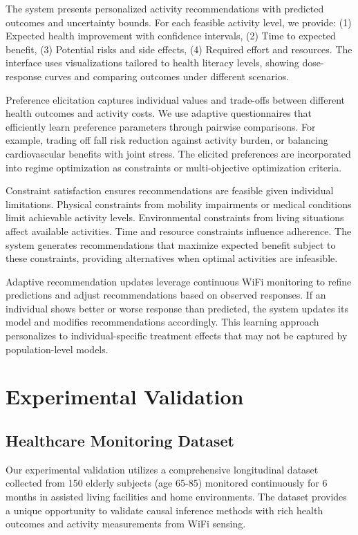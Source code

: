 \documentclass[journal]{IEEEtran}
\begin{document}
The system presents personalized activity recommendations with predicted outcomes and uncertainty bounds. For each feasible activity level, we provide: (1) Expected health improvement with confidence intervals, (2) Time to expected benefit, (3) Potential risks and side effects, (4) Required effort and resources. The interface uses visualizations tailored to health literacy levels, showing dose-response curves and comparing outcomes under different scenarios.

Preference elicitation captures individual values and trade-offs between different health outcomes and activity costs. We use adaptive questionnaires that efficiently learn preference parameters through pairwise comparisons. For example, trading off fall risk reduction against activity burden, or balancing cardiovascular benefits with joint stress. The elicited preferences are incorporated into regime optimization as constraints or multi-objective optimization criteria.

Constraint satisfaction ensures recommendations are feasible given individual limitations. Physical constraints from mobility impairments or medical conditions limit achievable activity levels. Environmental constraints from living situations affect available activities. Time and resource constraints influence adherence. The system generates recommendations that maximize expected benefit subject to these constraints, providing alternatives when optimal activities are infeasible.

Adaptive recommendation updates leverage continuous WiFi monitoring to refine predictions and adjust recommendations based on observed responses. If an individual shows better or worse response than predicted, the system updates its model and modifies recommendations accordingly. This learning approach personalizes to individual-specific treatment effects that may not be captured by population-level models.

\section{Experimental Validation}

\subsection{Healthcare Monitoring Dataset}

Our experimental validation utilizes a comprehensive longitudinal dataset collected from 150 elderly subjects (age 65-85) monitored continuously for 6 months in assisted living facilities and home environments. The dataset provides a unique opportunity to validate causal inference methods with rich health outcomes and activity measurements from WiFi sensing.
\end{document}
